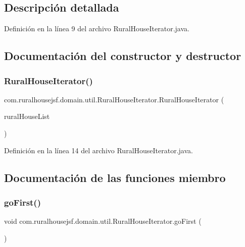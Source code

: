 \subsection{Descripción detallada}


Definición en la línea 9 del archivo Rural\+House\+Iterator.\+java.



\subsection{Documentación del constructor y destructor}
\mbox{\label{a00200_aa0a65be50d1149a49a37203d411279d3}} 
\subsubsection{\texorpdfstring{RuralHouseIterator()}{RuralHouseIterator()}}
{\footnotesize\ttfamily com.\+ruralhousejsf.\+domain.\+util.\+Rural\+House\+Iterator.\+Rural\+House\+Iterator (\begin{DoxyParamCaption}\item[{List$<$ \mbox{\hyperlink{a00188}{Rural\+House}} $>$}]{rural\+House\+List }\end{DoxyParamCaption})}



Definición en la línea 14 del archivo Rural\+House\+Iterator.\+java.



\subsection{Documentación de las funciones miembro}
\mbox{\label{a00200_a843246b6edfb1409f7fe9afc1215bc31}} 
\subsubsection{\texorpdfstring{goFirst()}{goFirst()}}
{\footnotesize\ttfamily void com.\+ruralhousejsf.\+domain.\+util.\+Rural\+House\+Iterator.\+go\+First (\begin{DoxyParamCaption}{ }\end{DoxyParamCaption})}



